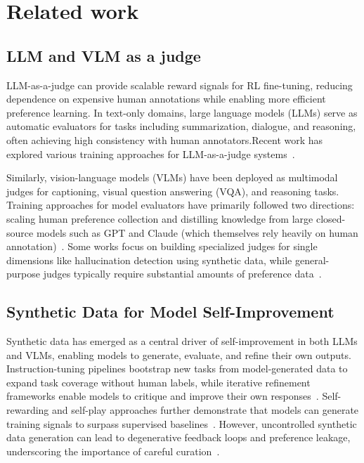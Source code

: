 \section{Related work}
\subsection{LLM and VLM as a judge}


LLM-as-a-judge can provide scalable reward signals for RL fine-tuning, reducing dependence on expensive human annotations while enabling more efficient preference learning. In text-only domains, large language models (LLMs) serve as automatic evaluators for tasks including summarization, dialogue, and reasoning, often achieving high consistency with human annotators.Recent work has explored various training approaches for LLM-as-a-judge systems~\cite{zheng2023llmjudge,lee2023rlaif,yuan2024srlm,cui2023ultrafeedback,lambert2024tulu, whitehouse2025j1incentivizingthinkingllmasajudge, saha2025learningplanreason}.

Similarly, vision-language models (VLMs) have been deployed as multimodal judges for captioning, visual question answering (VQA), and reasoning tasks. 
Training approaches for model evaluators have primarily followed two directions: scaling human preference collection and distilling knowledge from large closed-source models such as GPT and Claude (which themselves rely heavily on human annotation)~\cite{llava-critic, wang2025unified, vlrb, mmrb}. Some works focus on building specialized judges for single dimensions like hallucination detection using synthetic data, while general-purpose judges typically require substantial amounts of preference data~\cite{jing2024fgaif, 2023llavarlhf}.

\subsection{Synthetic Data for Model Self-Improvement}
Synthetic data has emerged as a central driver of self-improvement in both LLMs and VLMs, enabling models to generate, evaluate, and refine their own outputs. Instruction-tuning pipelines bootstrap new tasks from model-generated data to expand task coverage without human labels, while iterative refinement frameworks enable models to critique and improve their own responses~\cite{Wang2022SelfInstruct,Li2024GLAN,Madaan2023SelfRefine,Shinn2023Reflexion}. Self-rewarding and self-play approaches further demonstrate that models can generate training signals to surpass supervised baselines~\cite{alemohammad2024self}. However, uncontrolled synthetic data generation can lead to degenerative feedback loops and preference leakage, underscoring the importance of careful curation~\cite{Alemohammad2023MAD,Li2025PreferenceLeakage,liu2024bestpracticeslessonslearned}.

